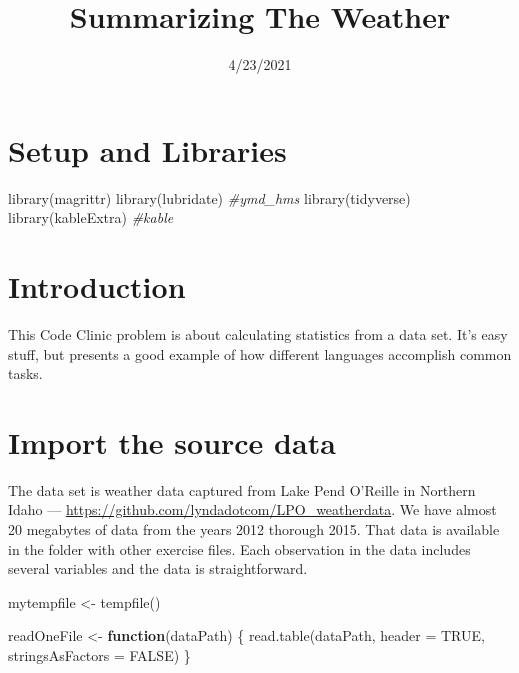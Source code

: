 \documentclass[
  11pt,
]{article}
\title{Summarizing The Weather}
\author{}
\date{\vspace{-2.5em}4/23/2021}
\newenvironment{Shaded}{\begin{snugshade}}{\end{snugshade}}
\newcommand{\AttributeTok}[1]{\textcolor[rgb]{0.77,0.63,0.00}{#1}}
\newcommand{\CommentTok}[1]{\textcolor[rgb]{0.56,0.35,0.01}{\textit{#1}}}
\newcommand{\ConstantTok}[1]{\textcolor[rgb]{0.00,0.00,0.00}{#1}}
\newcommand{\ControlFlowTok}[1]{\textcolor[rgb]{0.13,0.29,0.53}{\textbf{#1}}}
\newcommand{\FunctionTok}[1]{\textcolor[rgb]{0.00,0.00,0.00}{#1}}
\newcommand{\NormalTok}[1]{#1}
\newcommand{\OtherTok}[1]{\textcolor[rgb]{0.56,0.35,0.01}{#1}}
\begin{document}
\maketitle

{
\setcounter{tocdepth}{2}
\tableofcontents
}
\hypertarget{setup-and-libraries}{%
\section{Setup and Libraries}\label{setup-and-libraries}}

\begin{Shaded}
\begin{Highlighting}[]
\FunctionTok{library}\NormalTok{(magrittr)}
\FunctionTok{library}\NormalTok{(lubridate) }\CommentTok{\#ymd\_hms}
\FunctionTok{library}\NormalTok{(tidyverse)}
\FunctionTok{library}\NormalTok{(kableExtra) }\CommentTok{\#kable}
\end{Highlighting}
\end{Shaded}

\hypertarget{introduction}{%
\section{Introduction}\label{introduction}}

This Code Clinic problem is about calculating statistics from a data
set. It's easy stuff, but presents a good example of how different
languages accomplish common tasks.

\hypertarget{import-the-source-data}{%
\section{Import the source data}\label{import-the-source-data}}

The data set is weather data captured from Lake Pend O'Reille in
Northern Idaho --- \url{https://github.com/lyndadotcom/LPO_weatherdata}.
We have almost 20 megabytes of data from the years 2012 thorough 2015.
That data is available in the folder with other exercise files. Each
observation in the data includes several variables and the data is
straightforward.

\begin{Shaded}
\begin{Highlighting}[]
\NormalTok{mytempfile }\OtherTok{\textless{}{-}} \FunctionTok{tempfile}\NormalTok{()}

\NormalTok{readOneFile }\OtherTok{\textless{}{-}} \ControlFlowTok{function}\NormalTok{(dataPath) \{}
  \FunctionTok{read.table}\NormalTok{(dataPath,}
             \AttributeTok{header =} \ConstantTok{TRUE}\NormalTok{,}
             \AttributeTok{stringsAsFactors =} \ConstantTok{FALSE}\NormalTok{)}
\NormalTok{\}}
\end{Highlighting}
\end{Shaded}
\end{document}
